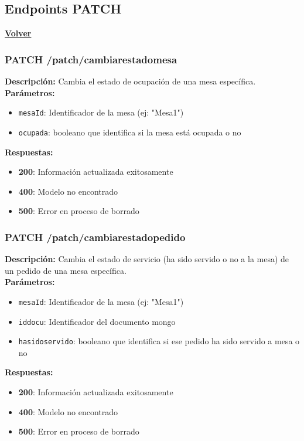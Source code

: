 \documentclass[12pt]{article}
\begin{document}
\clearpage

\subsection{Endpoints PATCH}
\hyperlink{anchor-indice}{\textbf{Volver}}\\

\subsubsection{PATCH /patch/cambiarestadomesa}
\textbf{Descripción:} Cambia el estado de ocupación de una mesa específica.\\

\textbf{Parámetros:}
\begin{itemize}
    \item \texttt{mesaId}: Identificador de la mesa (ej: "Mesa1")
    \item \texttt{ocupada}: booleano que identifica si la mesa está ocupada o no
\end{itemize}

\textbf{Respuestas:}
\begin{itemize}
    \item \textbf{200}: Información actualizada exitosamente
    \item \textbf{400}: Modelo no encontrado
    \item \textbf{500}: Error en proceso de borrado
\end{itemize}

\clearpage

\subsubsection{PATCH /patch/cambiarestadopedido}
\textbf{Descripción:} Cambia el estado de servicio (ha sido servido o no a la mesa) de un pedido de una mesa específica.\\

\textbf{Parámetros:}
\begin{itemize}
    \item \texttt{mesaId}: Identificador de la mesa (ej: "Mesa1")
    \item \texttt{iddocu}: Identificador del documento mongo
    \item \texttt{hasidoservido}: booleano que identifica si ese pedido ha sido servido a mesa o no
\end{itemize}

\textbf{Respuestas:}
\begin{itemize}
    \item \textbf{200}: Información actualizada exitosamente
    \item \textbf{400}: Modelo no encontrado
    \item \textbf{500}: Error en proceso de borrado
\end{itemize}
\end{document}
